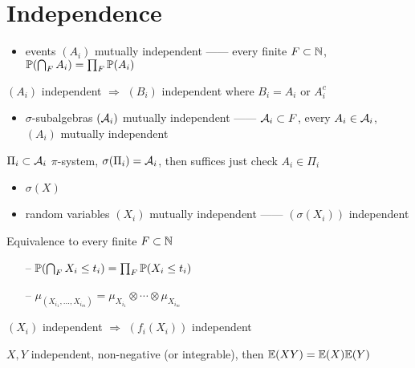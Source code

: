 \section{Independence}\label{sec:independence}

\begin{itemize}
    \item events $(A_i)$ mutually independent ------ every finite $F \subset \mathbb{N}$, $\mathbb{P}(\bigcap_F A_i) = \prod_F\mathbb{P}(A_i)$
\end{itemize}

\begin{fact}
    $(A_i)$ independent $\Rightarrow$ $(B_i)$ independent where $B_i = A_i$ or $A_i^c$
\end{fact}

\begin{itemize}
    \item $\sigma$-subalgebras $(\mathcal{A}_i)$ mutually independent ------ $\mathcal{A}_i \subset F$, every $A_i \in \mathcal{A}_i$, $(A_i)$ mutually independent
\end{itemize}

\begin{fact}
    $\Pi_i \subset \mathcal{A}_i$ $\pi$-system, $\sigma(\Pi_i) = \mathcal{A}_i$, then suffices just check $A_i \in \Pi_i$
\end{fact}

\begin{itemize}
    \item $\sigma(X)$
    \item random variables $(X_i)$ mutually independent ------ $(\sigma(X_i))$ independent
\end{itemize}

\begin{fact}Equivalence to every finite $F \subset \mathbb{N}$
    \begin{enumerate}
        \item[--] $\mathbb{P}(\bigcap_F X_i \leq t_i) = \prod_F \mathbb{P}(X_i \leq t_i)$
        \item[--] $\mu_{(X_{i_1}, \dots, X_{i_m})} = \mu_{X_{i_1}} \otimes \cdots \otimes \mu_{X_{i_m}}$
    \end{enumerate}
\end{fact}

\begin{fact}
    $(X_i)$ independent $\Rightarrow$ $(f_i(X_i))$ independent
\end{fact}

\begin{prop}
    $X, Y$ independent, non-negative (or integrable), then $\mathbb{E}(XY) = \mathbb{E}(X)\mathbb{E}(Y)$
\end{prop}

